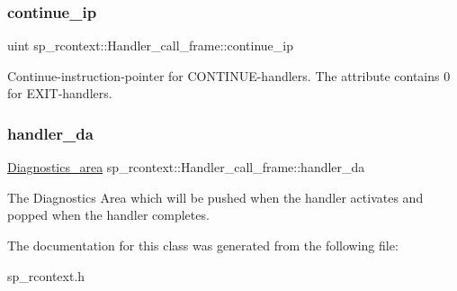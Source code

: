 \subsubsection{\texorpdfstring{continue\+\_\+ip}{continue\_ip}}
{\footnotesize\ttfamily uint sp\+\_\+rcontext\+::\+Handler\+\_\+call\+\_\+frame\+::continue\+\_\+ip}

Continue-\/instruction-\/pointer for C\+O\+N\+T\+I\+N\+UE-\/handlers. The attribute contains 0 for E\+X\+IT-\/handlers. \mbox{\label{classsp__rcontext_1_1Handler__call__frame_a394955960efe263b6199adbc7d3309aa}} 
\subsubsection{\texorpdfstring{handler\+\_\+da}{handler\_da}}
{\footnotesize\ttfamily \mbox{\hyperlink{classDiagnostics__area}{Diagnostics\+\_\+area}} sp\+\_\+rcontext\+::\+Handler\+\_\+call\+\_\+frame\+::handler\+\_\+da}

The Diagnostics Area which will be pushed when the handler activates and popped when the handler completes. 

The documentation for this class was generated from the following file\+:\begin{DoxyCompactItemize}
\item 
sp\+\_\+rcontext.\+h\end{DoxyCompactItemize}
